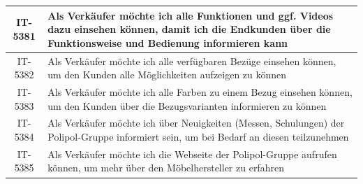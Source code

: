 \begin{table}[hbt]
\begin{minipage}[t]{1\textwidth}
\begin{tabularx}{\columnwidth}{ |c|X| }
            \hline
            IT-5381     & Als Verkäufer möchte ich alle Funktionen und ggf. Videos dazu einsehen können, damit ich die Endkunden über die Funktionsweise und Bedienung informieren kann                                      \\
            \hline
            IT-5382     & Als Verkäufer möchte ich alle verfügbaren Bezüge einsehen können, um den Kunden alle Möglichkeiten aufzeigen zu können
            \\
            \hline
            IT-5383     & Als Verkäufer möchte ich alle Farben zu einem Bezug einsehen können, um den Kunden über die Bezugsvarianten informieren zu können                                                                  \\
            \hline
            IT-5384     & Als Verkäufer möchte ich über Neuigkeiten (Messen, Schulungen) der Polipol-Gruppe informiert sein, um bei Bedarf an diesen teilzunehmen                                                            \\
            \hline
            IT-5385     & Als Verkäufer möchte ich die Webseite der Polipol-Gruppe aufrufen können, um mehr über den Möbelhersteller zu erfahren                                                                             \\
            \hline
        \end{tabularx}
        \label{tab:user_stories}
    \end{minipage}
\end{table}

\clearpage